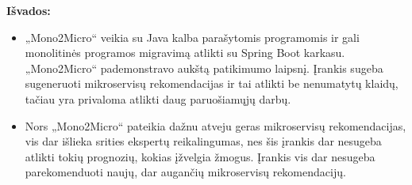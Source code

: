 \documentclass{VUMIFPSbakalaurinis}
\begin{document}
\textbf{Išvados:}
\begin{itemize}
    \item „Mono2Micro“ veikia su Java kalba parašytomis programomis ir gali monolitinės programos migravimą atlikti su Spring Boot karkasu. „Mono2Micro“ pademonstravo aukštą patikimumo laipsnį. Įrankis sugeba sugeneruoti mikroservisų rekomendacijas ir tai atlikti be nenumatytų klaidų, tačiau yra privaloma atlikti daug paruošiamųjų darbų.

    \item Nors „Mono2Micro“ pateikia dažnu atveju geras mikroservisų rekomendacijas, vis dar išlieka srities ekspertų reikalingumas, nes šis įrankis dar nesugeba atlikti tokių prognozių, kokias įžvelgia žmogus. Įrankis vis dar nesugeba parekomenduoti naujų, dar augančių mikroservisų rekomendacijų.





\end{itemize}

\printbibliography[heading=bibintoc]

\appendix  %

\end{document}
